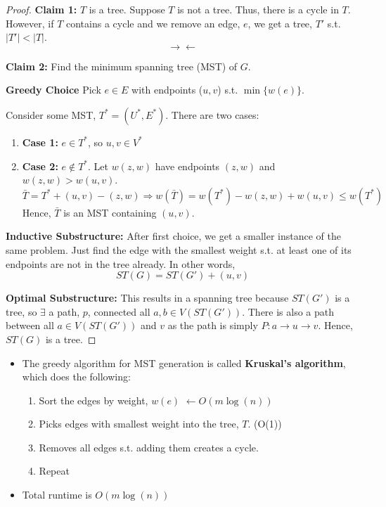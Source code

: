 \documentclass[11pt]{article}
\begin{document}
\begin{proof}
    \textbf{Claim 1:} \(T\) is a tree.
    Suppose \(T\) is not a tree. Thus, there is a cycle in \(T\). However, if \(T\) contains a cycle and we remove an edge, \(e\), we get a tree, \(T'\) s.t. \(|T'| < |T|\).
    \[\rightarrow \leftarrow\]

    \noindent \textbf{Claim 2:} Find the minimum spanning tree (MST) of \(G\).

    \noindent \textbf{Greedy Choice} Pick \(e \in E\) with endpoints (\(u, v\)) s.t. \(\min\{w(e)\}\).

    Consider some MST, \(T^* = (U^*, E^*)\). There are two cases: 
    \begin{enumerate}
        \item \textbf{Case 1:} \(e \in T^*\), so \(u,v \in V^*\)
        \item \textbf{Case 2:} \(e \notin T^*\). Let \(w(z,w)\) have endpoints \((z,w)\) and \(w(z, w) > w(u,v)\).
        \[
        \bar{T} = T^* + (u,v) - (z,w) \Rightarrow w(\bar{T}) = w(T^*) - w(z, w) + w(u,v) \leq w(T^*)
        \]
        Hence, \(\bar{T}\) is an MST containing \((u,v)\).
    \end{enumerate}

    \noindent \textbf{Inductive Substructure:} After first choice, we get a smaller instance of the same problem. Just find the edge with the smallest weight s.t. at least one of its endpoints are not in the tree already. In other words,
    \[
    ST(G) = ST(G') + (u,v)
    \]

    \noindent \textbf{Optimal Substructure:} This results in a spanning tree because \(ST(G')\) is a tree, so \(\exists\) a path, \(p\), connected all \(a, b \in V(ST(G'))\). There is also a path between all \(a \in V(ST(G'))\) and \(v\) as the path is simply \(P: a \rightarrow u \rightarrow v\). Hence, \(ST(G)\) is a tree.
\end{proof}
\begin{itemize}
    \item The greedy algorithm for MST generation is called \textbf{Kruskal's algorithm}, which does the following:
    \begin{enumerate}
        \item Sort the edges by weight, \(w(e)\) \(\leftarrow O(m \log(n))\)
        \item Picks edges with smallest weight into the tree, \(T\). (O(1))
        \item Removes all edges s.t. adding them creates a cycle.
        \item Repeat
    \end{enumerate}
    \item Total runtime is \(O(m \log(n))\)
\end{itemize}
\end{document}
